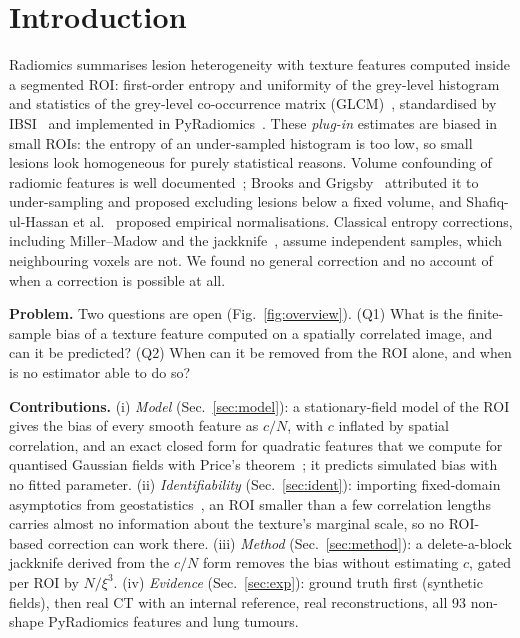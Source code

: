 \documentclass[runningheads]{llncs}
\begin{document}
\section{Introduction}
Radiomics summarises lesion heterogeneity with texture features computed inside a segmented ROI: first-order entropy and uniformity of the grey-level histogram and statistics of the grey-level co-occurrence matrix (GLCM)~\cite{haralick1973}, standardised by IBSI~\cite{zwanenburg2020} and implemented in PyRadiomics~\cite{vangriethuysen2017}. These \emph{plug-in} estimates are biased in small ROIs: the entropy of an under-sampled histogram is too low, so small lesions look homogeneous for purely statistical reasons. Volume confounding of radiomic features is well documented~\cite{welch2019}; Brooks and Grigsby~\cite{brooks2014} attributed it to under-sampling and proposed excluding lesions below a fixed volume, and Shafiq-ul-Hassan et al.~\cite{shafiq2017} proposed empirical normalisations. Classical entropy corrections, including Miller--Madow and the jackknife~\cite{miller1955,zahl1977,paninski2003}, assume independent samples, which neighbouring voxels are not. We found no general correction and no account of when a correction is possible at all.

\noindent\textbf{Problem.} Two questions are open (Fig.~\ref{fig:overview}). (Q1) What is the finite-sample bias of a texture feature computed on a spatially correlated image, and can it be predicted? (Q2) When can it be removed from the ROI alone, and when is no estimator able to do so?

\noindent\textbf{Contributions.} (i) \emph{Model} (Sec.~\ref{sec:model}): a stationary-field model of the ROI gives the bias of every smooth feature as $c/N$, with $c$ inflated by spatial correlation, and an exact closed form for quadratic features that we compute for quantised Gaussian fields with Price's theorem~\cite{price1958}; it predicts simulated bias with no fitted parameter. (ii) \emph{Identifiability} (Sec.~\ref{sec:ident}): importing fixed-domain asymptotics from geostatistics~\cite{zhang2004,stein1999}, an ROI smaller than a few correlation lengths carries almost no information about the texture's marginal scale, so no ROI-based correction can work there. (iii) \emph{Method} (Sec.~\ref{sec:method}): a delete-a-block jackknife derived from the $c/N$ form removes the bias without estimating $c$, gated per ROI by $N/\xi^3$. (iv) \emph{Evidence} (Sec.~\ref{sec:exp}): ground truth first (synthetic fields), then real CT with an internal reference, real reconstructions, all 93 non-shape PyRadiomics features and lung tumours.
\end{document}
